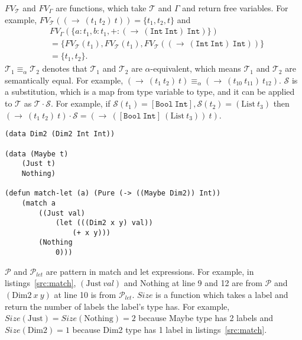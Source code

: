 \documentclass{article}
\begin{document}
$FV_\mathcal{T}$ and $FV_\Gamma$ are functions, which take $\mathcal{T}$ and $\Gamma$ and return free variables.
For example, $FV_\mathcal{T}((\rightarrow\ (t_1\ t_2)\ t)) = \{t_1, t_2, t\}$ and
\begin{equation*}
    \begin{aligned}
        &FV_\Gamma(\{a : t_1, b : t_1, + : (\rightarrow\ (\mathtt{Int}\ \mathtt{Int})\ \mathtt{Int})\}) \\
        &=\{FV_\mathcal{T}(t_1), FV_\mathcal{T}(t_1), FV_\mathcal{T}((\rightarrow\ (\mathtt{Int}\ \mathtt{Int})\ \mathtt{Int}))\} \\
        &=\{t_1, t_2\}.
    \end{aligned}
\end{equation*}
$\mathcal{T}_1 \equiv_\alpha \mathcal{T}_2$ denotes that $\mathcal{T}_1$ and $\mathcal{T}_2$ are $\alpha$-equivalent,
which means $\mathcal{T}_1$ and $\mathcal{T}_2$ are semantically equal.
For example, $(\rightarrow\ (t_1\ t_2)\ t) \equiv_\alpha (\rightarrow\ (t_{10}\ t_{11})\ t_{12})$.
$\mathcal{S}$ is a substitution, which is a map from type variable to type,
and it can be applied to $\mathcal{T}$ as $\mathcal{T} \cdot \mathcal{S}$.
For example, if $\mathcal{S}(t_1) = [\mathtt{Bool}\ \mathtt{Int}], \mathcal{S}(t_2) = (\mathrm{List}\ t_3)$ then
$(\rightarrow\ (t_1\ t_2)\ t) \cdot \mathcal{S} = (\rightarrow\ ([\mathtt{Bool}\ \mathtt{Int}]\ (\mathrm{List}\ t_3))\ t)$.

\begin{lstlisting}[caption=Example of pattern matching,label=src:match]
(data Dim2 (Dim2 Int Int))

(data (Maybe t)
    (Just t)
    Nothing)

(defun match-let (a) (Pure (-> ((Maybe Dim2)) Int))
    (match a
        ((Just val)
            (let (((Dim2 x y) val))
                (+ x y)))
        (Nothing
            0)))
\end{lstlisting}
$\mathcal{P}$ and $\mathcal{P}_{let}$ are pattern in match and let expressions.
For example, in listings~\ref{src:match}, $(\mathrm{Just}\ val)$ and Nothing at line 9 and 12 are from $\mathcal{P}$
and $(\mathrm{Dim2}\ x\ y)$ at line 10 is from $\mathcal{P}_{let}$.
$Size$ is a function which takes a label and return the number of labels the label's type has.
For example, $Size(\mathrm{Just}) = Size(\mathrm{Nothing}) = 2$ because Maybe type has 2 labels
and $Size(\mathrm{Dim2}) = 1$ because Dim2 type has 1 label in listings~\ref{src:match}.
\end{document}
